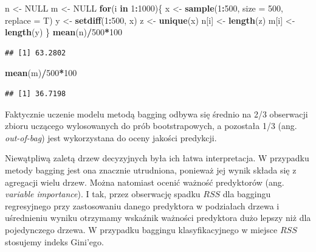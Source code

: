 \documentclass[
]{book}
\newenvironment{Shaded}{\begin{snugshade}}{\end{snugshade}}
\newcommand{\ControlFlowTok}[1]{\textcolor[rgb]{0.13,0.29,0.53}{\textbf{#1}}}
\newcommand{\DataTypeTok}[1]{\textcolor[rgb]{0.13,0.29,0.53}{#1}}
\newcommand{\DecValTok}[1]{\textcolor[rgb]{0.00,0.00,0.81}{#1}}
\newcommand{\KeywordTok}[1]{\textcolor[rgb]{0.13,0.29,0.53}{\textbf{#1}}}
\newcommand{\NormalTok}[1]{#1}
\newcommand{\OperatorTok}[1]{\textcolor[rgb]{0.81,0.36,0.00}{\textbf{#1}}}
\newcommand{\OtherTok}[1]{\textcolor[rgb]{0.56,0.35,0.01}{#1}}
\newcommand{\StringTok}[1]{\textcolor[rgb]{0.31,0.60,0.02}{#1}}
\theoremstyle{plain}
\theoremstyle{definition}
\theoremstyle{definition}
\theoremstyle{definition}
\theoremstyle{definition}
\theoremstyle{remark}
\begin{document}
\begin{Shaded}
\begin{Highlighting}[]
\NormalTok{n <-}\StringTok{ }\OtherTok{NULL}
\NormalTok{m <-}\StringTok{ }\OtherTok{NULL}
\ControlFlowTok{for}\NormalTok{(i }\ControlFlowTok{in} \DecValTok{1}\OperatorTok{:}\DecValTok{1000}\NormalTok{)\{}
\NormalTok{    x <-}\StringTok{ }\KeywordTok{sample}\NormalTok{(}\DecValTok{1}\OperatorTok{:}\DecValTok{500}\NormalTok{, }\DataTypeTok{size =} \DecValTok{500}\NormalTok{, }\DataTypeTok{replace =}\NormalTok{ T)}
\NormalTok{    y <-}\StringTok{ }\KeywordTok{setdiff}\NormalTok{(}\DecValTok{1}\OperatorTok{:}\DecValTok{500}\NormalTok{, x)}
\NormalTok{    z <-}\StringTok{ }\KeywordTok{unique}\NormalTok{(x)}
\NormalTok{    n[i] <-}\StringTok{ }\KeywordTok{length}\NormalTok{(z)}
\NormalTok{    m[i] <-}\StringTok{ }\KeywordTok{length}\NormalTok{(y)}
\NormalTok{\}}
\KeywordTok{mean}\NormalTok{(n)}\OperatorTok{/}\DecValTok{500}\OperatorTok{*}\DecValTok{100}
\end{Highlighting}
\end{Shaded}

\begin{verbatim}
## [1] 63.2802
\end{verbatim}

\begin{Shaded}
\begin{Highlighting}[]
\KeywordTok{mean}\NormalTok{(m)}\OperatorTok{/}\DecValTok{500}\OperatorTok{*}\DecValTok{100}
\end{Highlighting}
\end{Shaded}

\begin{verbatim}
## [1] 36.7198
\end{verbatim}

Faktycznie uczenie modelu metodą bagging odbywa się średnio na 2/3 obserwacji zbioru uczącego wylosowanych do prób bootstrapowych, a pozostała 1/3 (ang. \emph{out-of-bag}) jest wykorzystana do oceny jakości predykcji.

Niewątpliwą zaletą drzew decyzyjnych była ich łatwa interpretacja. W przypadku metody bagging jest ona znacznie utrudniona, ponieważ jej wynik składa się z agregacji wielu drzew. Można natomiast ocenić ważność predyktorów (ang. \emph{variable importance}). I tak, przez obserwację spadku \(RSS\) dla baggingu regresyjnego przy zastosowaniu danego predyktora w podziałach drzewa i uśrednieniu wyniku otrzymamy wskaźnik ważności predyktora dużo lepszy niż dla pojedynczego drzewa. W przypadku baggingu klasyfikacyjnego w miejsce \(RSS\) stosujemy indeks Gini'ego.
\end{document}
